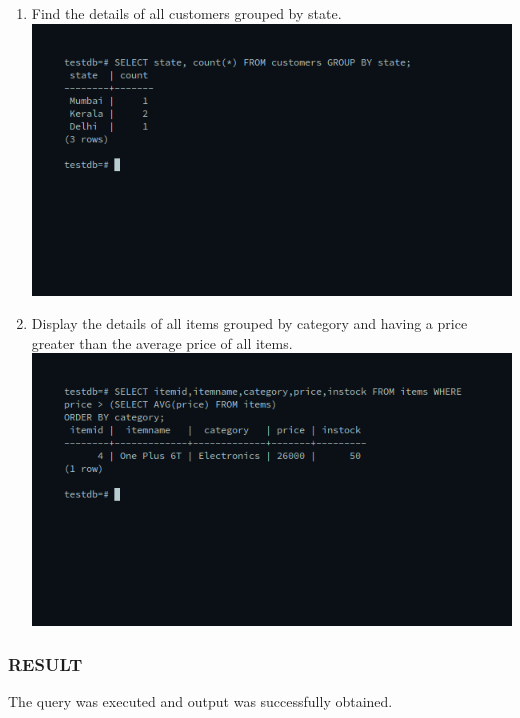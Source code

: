 \documentclass[10pt,a4paper,titlepage]{report}
\begin{document}
{\begin{enumerate}
	\item Find the details of all customers grouped by state.\newline
	\includegraphics[width=\linewidth]{../Images/Joins/13.png}
	\item Display the details of all items grouped by category and having a price greater than the average price of all items.\newline
	\includegraphics[width=\linewidth]{../Images/Joins/14.png}
\end{enumerate}

\subsubsection*{RESULT}
The query was executed and output was successfully obtained.

}
\end{document}
